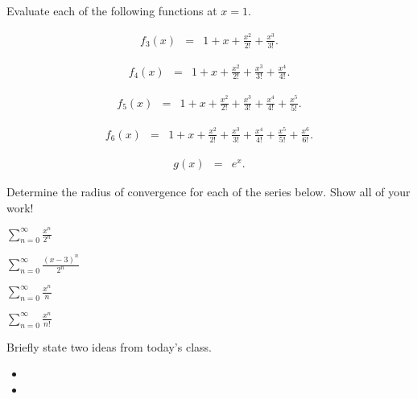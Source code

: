 
\begin{problem}
\item Evaluate each of the following functions at $x=1$.
  \begin{subproblem}
  \item 
    \begin{eqnarray*}
      f_3(x) & = & 1 + x + \frac{x^2}{2!} + \frac{x^3}{3!}.
    \end{eqnarray*}
    \vfill
  \item 
    \begin{eqnarray*}
      f_4(x) & = & 1 + x + \frac{x^2}{2!} + \frac{x^3}{3!} + \frac{x^4}{4!}.
    \end{eqnarray*}
    \vfill
  \item 
    \begin{eqnarray*}
      f_5(x) & = & 1 + x + \frac{x^2}{2!} + \frac{x^3}{3!} +
                   \frac{x^4}{4!} + \frac{x^5}{5!}.
    \end{eqnarray*}
    \vfill
  \item 
    \begin{eqnarray*}
      f_6(x) & = & 1 + x + \frac{x^2}{2!} + \frac{x^3}{3!} +
                   \frac{x^4}{4!} + \frac{x^5}{5!} + \frac{x^6}{6!}.
    \end{eqnarray*}
    \vfill
  \item 
    \begin{eqnarray*}
      g(x) & = & e^x.
    \end{eqnarray*}
    \vfill
  \end{subproblem}
\end{problem}


\begin{problem}
\item Determine the radius of convergence for each of the series
  below. Show all of your work!  
  \begin{subproblem}
    \item $\sum_{n=0}^\infty \frac{x^n}{2^n}$
      \vfill
    \item $\sum_{n=0}^\infty \frac{(x-3)^n}{2^n}$
      \vfill
    \item $\sum_{n=0}^\infty \frac{x^n}{n} $
      \vfill
    \item $\sum_{n=0}^\infty \frac{x^n}{n!} $
      \vfill
  \end{subproblem}
\end{problem}


\postClass

\begin{problem}
\item Briefly state two ideas from today's class.
  \begin{itemize}
  \item 
  \item 
  \end{itemize}
\item 
  \begin{subproblem}
    \item
  \end{subproblem}
\end{problem}


